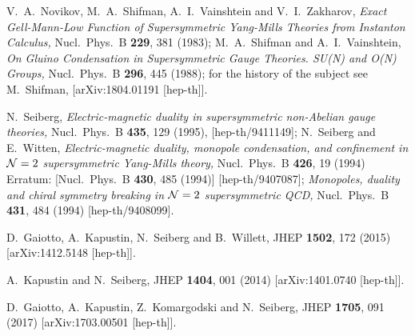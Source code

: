 \documentclass[epsfig,12pt]{article}
\begin{document}
\begin{thebibliography}{99}
{ 
V.~A.~Novikov, M.~A.~Shifman, A.~I.~Vainshtein and V.~I.~Zakharov,
{\em Exact Gell-Mann-Low Function of Supersymmetric Yang-Mills Theories from Instanton Calculus,}
  Nucl.\ Phys.\ B {\bf 229}, 381 (1983);
  M.~A.~Shifman and A.~I.~Vainshtein,
{\em On Gluino Condensation in Supersymmetric Gauge Theories. SU(N) and O(N) Groups,}
  Nucl.\ Phys.\ B {\bf 296}, 445 (1988); for the history of the subject see
   M.~Shifman,
  [arXiv:1804.01191 [hep-th]].
  
    N.~Seiberg,
{\em Electric-magnetic duality in supersymmetric non-Abelian gauge theories,}
  Nucl.\ Phys.\ B {\bf 435}, 129 (1995),
  [hep-th/9411149];
 N.~Seiberg and E.~Witten,
  {\em Electric-magnetic duality, monopole condensation, and confinement in ${\cal N}=2$ supersymmetric Yang-Mills theory,}
  Nucl.\ Phys.\ B {\bf 426}, 19 (1994)
  Erratum: [Nucl.\ Phys.\ B {\bf 430}, 485 (1994)]
  [hep-th/9407087];
  {\em Monopoles, duality and chiral symmetry breaking in  ${\cal N}=2$ supersymmetric QCD,}
  Nucl.\ Phys.\ B {\bf 431}, 484 (1994)
  [hep-th/9408099].
  
D.~Gaiotto, A.~Kapustin, N.~Seiberg and B.~Willett,
  JHEP {\bf 1502}, 172 (2015)
  [arXiv:1412.5148 [hep-th]].

 A.~Kapustin and N.~Seiberg,
  JHEP {\bf 1404}, 001 (2014)
  [arXiv:1401.0740 [hep-th]].

 D.~Gaiotto, A.~Kapustin, Z.~Komargodski and N.~Seiberg,
  JHEP {\bf 1705}, 091 (2017)
  [arXiv:1703.00501 [hep-th]].
  
}
\end{thebibliography}
\end{document}
